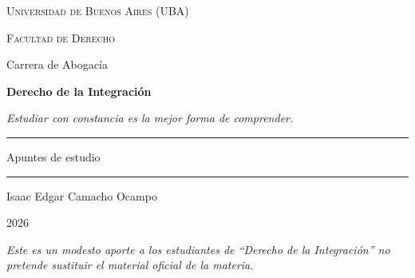 \documentclass[12pt,oneside]{book}
\newcommand{\universidad}{Universidad de Buenos Aires (UBA)}
\newcommand{\facultad}{Facultad de Derecho}
\newcommand{\carrera}{Carrera de Abogacía}
\newcommand{\materia}{Derecho de la Integración}
\newcommand{\autor}{Isaac Edgar Camacho Ocampo}
\newcommand{\anio}{2026}
\begin{document}
\frontmatter

\begin{titlepage}

\thispagestyle{empty}

\begin{center}

\vspace*{1cm}

{\large \textsc{\universidad}}

\vspace{0.2cm}

{\large \textsc{\facultad}}

\vspace{0.2cm}

{\large \carrera}

\vspace{3cm}

{\Huge \textbf{\materia}}

\vspace{1cm}

\textit{Estudiar con constancia es la mejor forma de comprender.}

\vspace{1.2cm}

\rule{0.70\textwidth}{0.5pt}

\vspace{0.5cm}

{\large Apuntes de estudio}

\vspace{0.5cm}

\rule{0.70\textwidth}{0.5pt}

\vfill

{\large \autor}

\vspace{0.3cm}

{\large \anio}

\end{center}

\vfill

\begin{flushleft}
\textit{Este es un modesto aporte a los estudiantes de ``\materia'' no pretende sustituir el material oficial de la materia.}
\end{flushleft}

\end{titlepage}
\setcounter{page}{2}%
\end{document}
